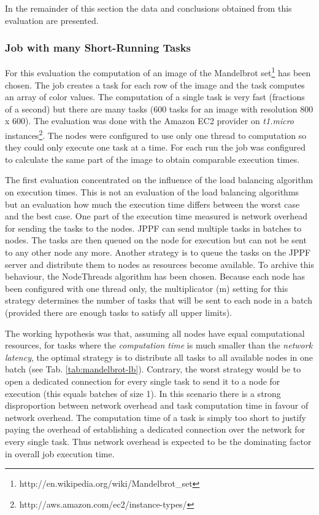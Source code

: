 \documentclass[12pt]{article}
\begin{document}
In the remainder of this section the data and conclusions obtained from this evaluation are presented.

\subsubsection{Job with many Short-Running Tasks}
\label{short-tasks}

For this evaluation the computation of an image of the Mandelbrot set\footnote{http://en.wikipedia.org/wiki/Mandelbrot\_set} has been chosen. The job creates a task for each row of the image and the task computes an array of color values. The computation of a single task is very fast (fractions of a second) but there are many tasks (600 tasks for an image with resolution 800 x 600). The evaluation was done with the Amazon EC2 provider on \textit{t1.micro} instances\footnote{http://aws.amazon.com/ec2/instance-types/}. The nodes were configured to use only one thread to computation so they could only execute one task at a time. For each run the job was configured to calculate the same part of the image to obtain comparable execution times. 

The first evaluation concentrated on the influence of the load balancing algorithm on execution times. This is not an evaluation of the load balancing algorithms but  an evaluation how much the execution time differs between the worst case and the best case. One part of the execution time measured is network overhead for sending the tasks to the nodes. JPPF can send multiple tasks in batches to nodes. The tasks are then queued on the node for execution but can not be sent to any other node any more. Another strategy is to queue the tasks on the JPPF server and distribute them to nodes as resources become available. To archive this behaviour, the NodeThreads algorithm has been chosen. Because each node has been configured with one thread only, the multiplicator (m) setting for this strategy determines the number of tasks that will be sent to each node in a batch (provided there are enough tasks to satisfy all upper limits).

The working hypothesis was that, assuming all nodes have equal computational resources, for tasks where the \textit{computation time} is much smaller than the \textit{network latency}, the optimal strategy is to distribute all tasks to all available nodes in one batch (see Tab. \ref{tab:mandelbrot-lb}). Contrary, the worst strategy would be to open a dedicated connection for every single task to send it to a node for execution (this equals batches of size 1). In this scenario there is a strong disproportion between network overhead and task computation time in favour of network overhead. The computation time of a task is simply too short to justify paying the overhead of establishing a dedicated connection over the network for every single task. Thus network overhead is expected to be the dominating factor in overall job execution time.
\end{document}
